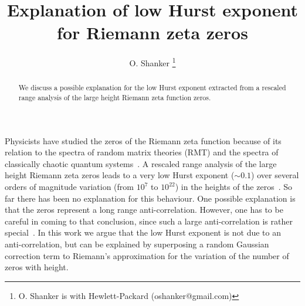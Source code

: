 \documentclass[11pt]{article}
\begin{document}
\title{Explanation of low Hurst exponent for Riemann zeta zeros}


\author{O. Shanker \thanks{O. Shanker is with Hewlett-Packard (oshanker@gmail.com)}
}

\date{}

\maketitle
\thispagestyle{empty}

\begin{abstract}
We discuss a possible explanation for the low Hurst exponent
extracted from a rescaled range analysis
of the large height Riemann zeta function zeros.
\end{abstract}


Physicists have studied the zeros of the Riemann zeta function
because of its  relation
to the spectra of random matrix theories (RMT)
\cite{Wigner(1967),Gaudin and Mehta (1960),Gaudin(1961),Dyson(1962)}
and the spectra of classically chaotic quantum
systems~\cite{Berry(1985),Berry(1986),Berry(1987),Berry(1988)}.
A rescaled range analysis
of the large height Riemann zeta zeros leads to
a very low Hurst exponent ($\sim 0.1$)
over several orders of magnitude variation
(from $10^{7}$ to $10^{22}$) in the heights of the zeros~\cite{os6}.
So far there has been no explanation for this behaviour.
One possible explanation is that the zeros
represent a long range anti-correlation. However, one has to
be careful in coming to that conclusion, since such a large anti-correlation
is rather special~\cite{Govind}. In this work we
argue that the low Hurst exponent is not due to an anti-correlation,
but can be explained by superposing a random Gaussian correction
term to Riemann's approximation
for the variation of the number of zeros with height.
\end{document}
